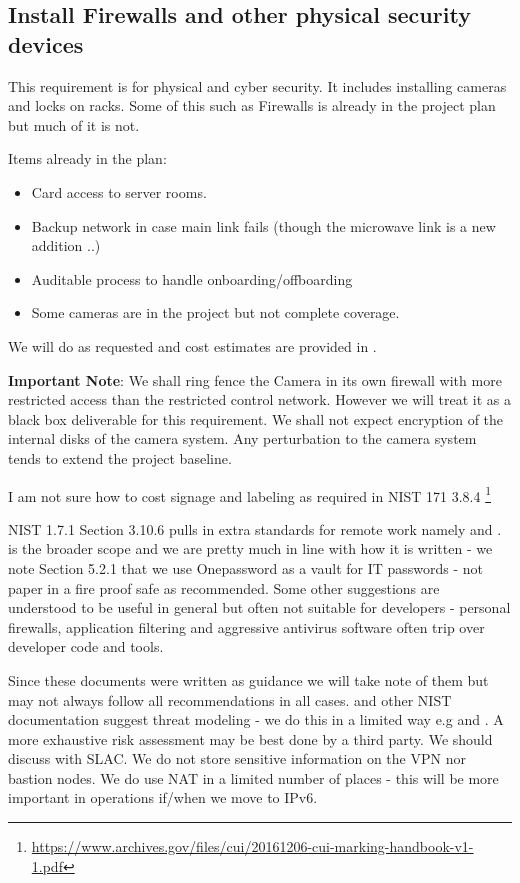 
\subsection{Install Firewalls and other physical security devices} \label{sec:2firewalls}

This requirement is for physical and cyber security. It includes installing cameras and locks on racks.
Some of this such as Firewalls is already in the project plan but much of it is not.

Items already in the plan:
\begin{itemize}
\item Card access to server rooms.
\item Backup network in case main link fails (though the microwave link is a new addition ..)
\item Auditable process to handle onboarding/offboarding
\item Some cameras are in the project but not complete coverage.

\end{itemize}

We will do as requested and cost estimates are provided in .

{\bf Important Note}: We shall ring fence the Camera in its own firewall with more restricted access than the restricted control network.
However we will treat it as a black box deliverable for this requirement. We shall not expect encryption of the internal disks of the camera system. Any perturbation to the camera system tends to extend the project baseline.

I am not sure how to cost signage and labeling as required in NIST 171 3.8.4 \footnote{\url{https://www.archives.gov/files/cui/20161206-cui-marking-handbook-v1-1.pdf}}

NIST 1.7.1 Section 3.10.6 pulls in extra standards for remote work namely  and .
 is the broader scope and we are pretty much in line with how it is written - we note Section 5.2.1 that we use Onepassword as a vault for IT passwords - not paper in a fire proof safe as recommended.
Some other suggestions are understood to be useful in general but often not suitable for developers - personal firewalls, application filtering  and aggressive antivirus software often trip over developer code and tools.

Since these documents were written  as guidance we will take note of them but may not always follow all recommendations in all cases.
 and other NIST documentation suggest threat modeling - we do this in a limited way e.g  and . A more exhaustive risk assessment may be best done by a third party. We should discuss with SLAC.
We do not store sensitive information on the VPN nor bastion nodes.
We do use NAT in a limited number of places - this will be more important in operations if/when we move to IPv6.


